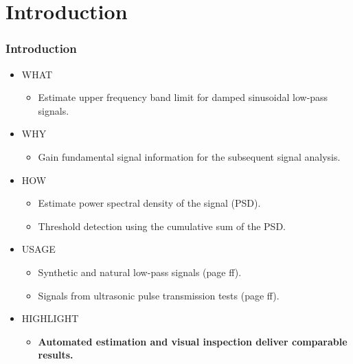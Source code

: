 \documentclass[11pt,aspectratio=169]{beamer}
\begin{document}
	\section{Introduction}
	\begin{frame}
		\frametitle{Introduction}
		\begin{itemize}
			\item \textcolor{RIPtitlecol}{WHAT}
			\begin{itemize}
				\item Estimate upper frequency band limit for damped sinusoidal low-pass signals.
			\end{itemize}
			\item \textcolor{RIPtitlecol}{WHY}
			\begin{itemize}
				\item Gain fundamental signal information for the subsequent signal analysis.
			\end{itemize}
			\item \textcolor{RIPtitlecol}{HOW}
			\begin{itemize}
				\item Estimate power spectral density of the signal (PSD).
				\item Threshold detection using the cumulative sum of the PSD.
			\end{itemize}
			\item \textcolor{RIPtitlecol}{USAGE}
			\begin{itemize}
				\item Synthetic and natural low-pass signals (page \pageref{res:synthetic} ff).
				\item Signals from ultrasonic pulse transmission tests (page \pageref{res:natural} ff).
			\end{itemize}
			\item \textcolor{RIPtitlecol}{HIGHLIGHT}
			\begin{itemize}
				\item \textbf{Automated estimation and visual inspection deliver comparable results.}
			\end{itemize}
		\end{itemize}
	\end{frame}
\end{document}
